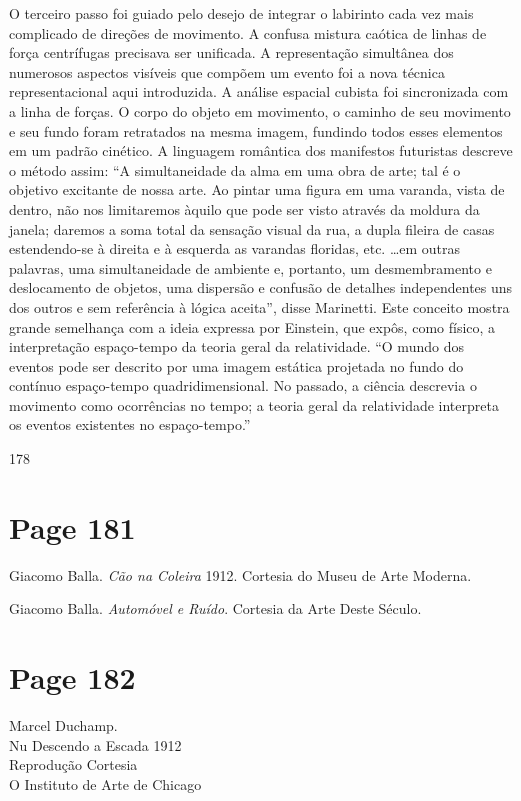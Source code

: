 \documentclass[a4paper]{article}
\begin{document}
O terceiro passo foi guiado pelo desejo de integrar o labirinto cada vez mais complicado de direções de movimento. A confusa mistura caótica de linhas de força centrífugas precisava ser unificada. A representação simultânea dos numerosos aspectos visíveis que compõem um evento foi a nova técnica representacional aqui introduzida. A análise espacial cubista foi sincronizada com a linha de forças. O corpo do objeto em movimento, o caminho de seu movimento e seu fundo foram retratados na mesma imagem, fundindo todos esses elementos em um padrão cinético. A linguagem romântica dos manifestos futuristas descreve o método assim: ``A simultaneidade da alma em uma obra de arte; tal é o objetivo excitante de nossa arte. Ao pintar uma figura em uma varanda, vista de dentro, não nos limitaremos àquilo que pode ser visto através da moldura da janela; daremos a soma total da sensação visual da rua, a dupla fileira de casas estendendo-se à direita e à esquerda as varandas floridas, etc. \ldots em outras palavras, uma simultaneidade de ambiente e, portanto, um desmembramento e deslocamento de objetos, uma dispersão e confusão de detalhes independentes uns dos outros e sem referência à lógica aceita'', disse Marinetti. Este conceito mostra grande semelhança com a ideia expressa por Einstein, que expôs, como físico, a interpretação espaço-tempo da teoria geral da relatividade. ``O mundo dos eventos pode ser descrito por uma imagem estática projetada no fundo do contínuo espaço-tempo quadridimensional. No passado, a ciência descrevia o movimento como ocorrências no tempo; a teoria geral da relatividade interpreta os eventos existentes no espaço-tempo.''

178

\newpage
\section*{Page 181}

Giacomo Balla. \textit{Cão na Coleira} 1912. Cortesia do Museu de Arte Moderna.

\bigskip

Giacomo Balla. \textit{Automóvel e Ruído}. Cortesia da Arte Deste Século.

\vfill
{}

\newpage
\section*{Page 182}

Marcel Duchamp.\\
Nu Descendo a Escada 1912\\
Reprodução Cortesia\\
O Instituto de Arte de Chicago
\end{document}
